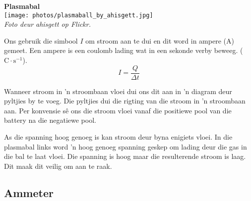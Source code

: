 \begin{minipage}{.5\textwidth}
\begin{center}
\textbf{Plasmabal}\\
\texttt{[image: photos/plasmaball\_by\_ahisgett.jpg]}\\
\textit{Foto deur ahisgett op Flickr.}
\end{center}   
\end{minipage}
\begin{minipage}{.5\textwidth}
Ons gebruik die simbool $I$ om stroom aan te dui en dit word in ampere
(A) gemeet. Een ampere is een coulomb lading wat in een sekonde verby beweeg.
($\text{C} \cdot \text{s}^{-1}$).
\begin{equation*}
\boxed{I = \frac{Q}{\Delta t}}
\end{equation*}

Wanneer stroom in 'n stroombaan vloei dui ons dit aan in 'n diagram deur
pyltjies by te voeg. Die pyltjies dui die rigting van die
stroom in 'n stroombaan aan. Per konvensie s\^e ons die stroom vloei vanaf die
positiewe pool van die battery na die negatiewe pool.

As die spanning hoog genoeg is kan stroom deur byna enigiets vloei. In die
plasmabal links word 'n hoog genoeg spanning geskep om lading deur die gas in
die bal te laat vloei. Die spanning is hoog maar die resulterende stroom is
laag. Dit maak dit veilig om aan te raak.
\end{minipage}




\subsection*{Ammeter}

